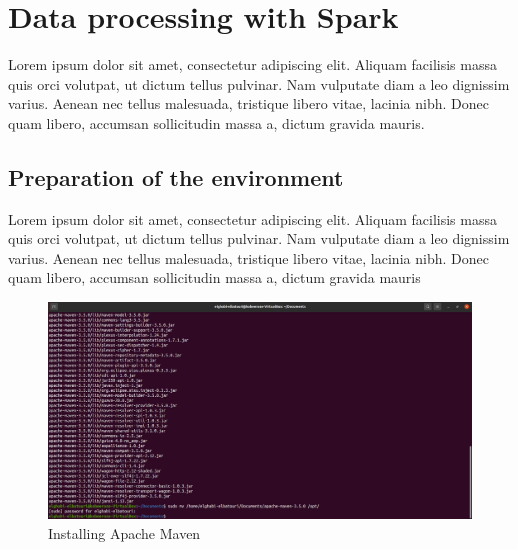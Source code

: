 \chapter{Data processing with Spark}
\par Lorem ipsum dolor sit amet, consectetur adipiscing elit. Aliquam facilisis massa quis orci volutpat, ut dictum tellus pulvinar. Nam vulputate diam a leo dignissim varius. Aenean nec tellus malesuada, tristique libero vitae, lacinia nibh. Donec quam libero, accumsan sollicitudin massa a, dictum gravida mauris.
\begin{spacing}{1.2}
\section{Preparation of the environment }
\par Lorem ipsum dolor sit amet, consectetur adipiscing elit. Aliquam facilisis massa quis orci volutpat, ut dictum tellus pulvinar. Nam vulputate diam a leo dignissim varius. Aenean nec tellus malesuada, tristique libero vitae, lacinia nibh. Donec quam libero, accumsan sollicitudin massa a, dictum gravida mauris
\\
\begin{figure}[!htb] 
\begin{center} 
\includegraphics[width=1\linewidth]{Pictures/HBase/Data processing with Spark/Preparation of the environment/Installing Apache Maven} 
\end{center} 
\caption{Installing Apache Maven} 
\end{figure}  \FloatBarrier
\\


\end{spacing}
